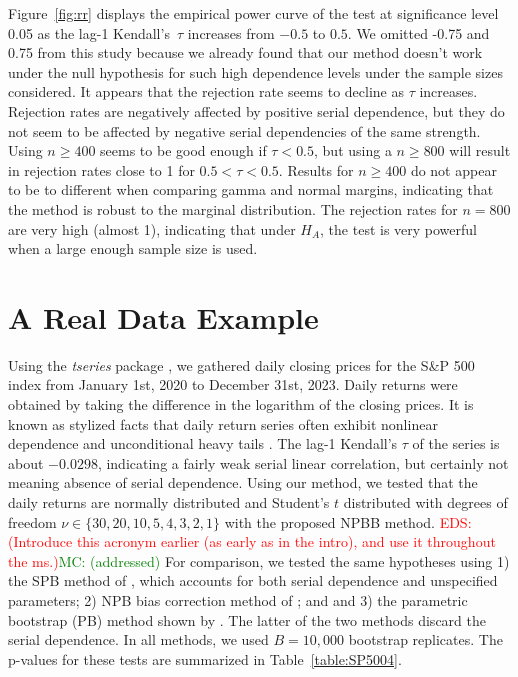 \documentclass[APA,Times1COL]{WileyNJDv5} %
\newcommand{\eds}[1]{\textcolor{red}{EDS: (#1)}}
\newcommand{\mc}[1]{\textcolor{green}{MC: (#1)}}
\begin{document}
Figure~\ref{fig:rr} displays the empirical power curve of the test at
significance level 0.05 as the lag-1 Kendall's~$\tau$ increases from
$-0.5$ to $0.5$. We omitted -0.75 and 0.75 from this study because we already 
found that our method doesn't work under the null hypothesis for such high
dependence levels under the sample sizes considered. It appears that the 
rejection rate seems to decline as $\tau$
increases. Rejection rates are negatively affected by positive serial 
dependence, but they do not seem to be affected by negative serial dependencies
of the same strength.
Using $n \geq 400$ seems to be good enough
if $\tau < 0.5$, but using a $n \geq 800$ will result in 
rejection rates close to 1 for $0.5 < \tau < 0.5$.
Results for $n \geq 400$
do not appear to be to different when comparing gamma and normal 
margins, indicating that the method is robust to the marginal distribution.
The rejection rates for $n = 800$ are very 
high (almost 1), indicating that under $H_A$, the test is very powerful 
when a large enough sample size is used.


\section{A Real Data Example}
\label{sec:real}

Using the \textsl{tseries} package \citep{tseries}, 
we gathered daily closing prices for the S\&P 500 index from January 1st, 2020
to December 31st, 2023. Daily returns were obtained by taking the difference in
the logarithm of the closing prices. 
It is known as stylized facts that daily return series often exhibit nonlinear
dependence and unconditional heavy tails \citep[e.g.,][]{ryden1998stylized,
  cont2001empirical}. The lag-1 Kendall's $\tau$ of the series is
about $-0.0298$, indicating a fairly weak serial linear correlation, but
certainly not meaning absence of serial dependence.
Using our method, we tested that the daily returns are normally
distributed and Student's $t$ distributed 
with degrees of freedom $\nu \in \{30, 20, 10, 5, 4, 3, 2, 1\}$
with the proposed NPBB method.
\eds{Introduce this acronym earlier (as early as in the intro), and use it 
throughout the ms.}\mc{addressed}
For comparison, we tested the same hypotheses using 1) the
SPB method of \citet{zeimbekakis2022misuses},
which accounts for both serial dependence and unspecified parameters;
2) NPB bias correction method of
\citet{babu2004goodness}; and and 3) the parametric bootstrap (PB) method shown
by \citet{zeimbekakis2022misuses}. The latter of the two methods discard the
serial dependence. In all methods, we used $B = 10,000$ bootstrap replicates.
The p-values for these tests are summarized in 
Table~\ref{table:SP5004}.
\end{document}
